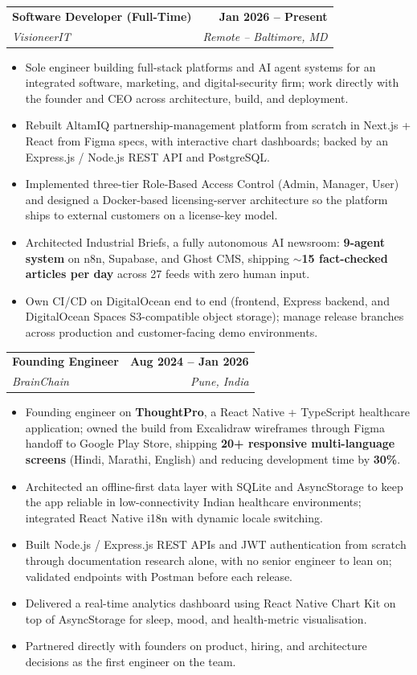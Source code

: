 \documentclass[letterpaper,11pt]{article}
\makeatletter
\newcommand{\resumeItem}[1]{
  \item\small{
    {#1 \vspace{-2pt}}
  }
}
\newcommand{\resumeSubheading}[4]{
  \vspace{-2pt}\item
    \begin{tabular*}{1.0\textwidth}[t]{l@{\extracolsep{\fill}}r}
      \textbf{#1} & \textbf{\small #2} \\
      \textit{\small#3} & \textit{\small #4} \\
    \end{tabular*}\vspace{-7pt}
}
\newcommand{\resumeItemListStart}{\begin{itemize}}
\newcommand{\resumeItemListEnd}{\end{itemize}\vspace{-5pt}}
\makeatother
\begin{document}
    \resumeSubheading
      {Software Developer (Full-Time)}{Jan 2026 -- Present}
      {VisioneerIT}{Remote -- Baltimore, MD}
      \resumeItemListStart
        \resumeItem{Sole engineer building full-stack platforms and AI agent systems for an integrated software, marketing, and digital-security firm; work directly with the founder and CEO across architecture, build, and deployment.}
        \resumeItem{Rebuilt AltamIQ partnership-management platform from scratch in Next.js + React from Figma specs, with interactive chart dashboards; backed by an Express.js / Node.js REST API and PostgreSQL.}
        \resumeItem{Implemented three-tier Role-Based Access Control (Admin, Manager, User) and designed a Docker-based licensing-server architecture so the platform ships to external customers on a license-key model.}
        \resumeItem{Architected Industrial Briefs, a fully autonomous AI newsroom: \textbf{9-agent system} on n8n, Supabase, and Ghost CMS, shipping \textbf{$\sim$15 fact-checked articles per day} across 27 feeds with zero human input.}
        \resumeItem{Own CI/CD on DigitalOcean end to end (frontend, Express backend, and DigitalOcean Spaces S3-compatible object storage); manage release branches across production and customer-facing demo environments.}
      \resumeItemListEnd

    \resumeSubheading
      {Founding Engineer}{Aug 2024 -- Jan 2026}
      {BrainChain}{Pune, India}
      \resumeItemListStart
        \resumeItem{Founding engineer on \textbf{ThoughtPro}, a React Native + TypeScript healthcare application; owned the build from Excalidraw wireframes through Figma handoff to Google Play Store, shipping \textbf{20+ responsive multi-language screens} (Hindi, Marathi, English) and reducing development time by \textbf{30\%}.}
        \resumeItem{Architected an offline-first data layer with SQLite and AsyncStorage to keep the app reliable in low-connectivity Indian healthcare environments; integrated React Native i18n with dynamic locale switching.}
        \resumeItem{Built Node.js / Express.js REST APIs and JWT authentication from scratch through documentation research alone, with no senior engineer to lean on; validated endpoints with Postman before each release.}
        \resumeItem{Delivered a real-time analytics dashboard using React Native Chart Kit on top of AsyncStorage for sleep, mood, and health-metric visualisation.}
        \resumeItem{Partnered directly with founders on product, hiring, and architecture decisions as the first engineer on the team.}
      \resumeItemListEnd
\end{document}
